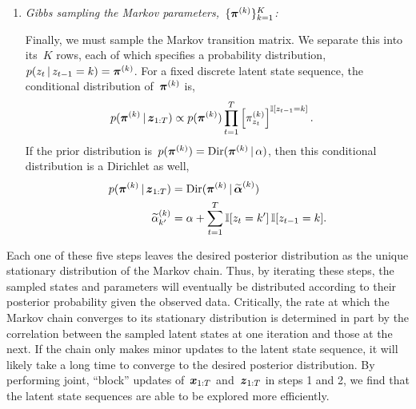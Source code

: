 \documentclass{article}
\begin{document}
\begin{enumerate}
  \item \textit{Gibbs sampling the Markov parameters,~$\{\boldsymbol{\pi}^{(k)}\}_{k=1}^K$:}
    
    Finally, we must sample the Markov transition matrix. We separate
    this into its~$K$ rows, each of which specifies a probability
    distribution,~$p(z_t \,|\, z_{t-1}=k) = \boldsymbol{\pi}^{(k)}$.  For a fixed
    discrete latent state sequence, the conditional distribution of~$\boldsymbol{\pi}^{(k)}$ 
    is,
    \begin{align}
      p(\boldsymbol{\pi}^{(k)} \,|\, \boldsymbol{z}_{1:T}) &\propto
      p(\boldsymbol{\pi}^{(k)}) \prod_{t=1}^T \left[ \pi_{z_t}^{(k)} \right]^{\mathbb{I}[z_{t-1}=k]}.
    \end{align}
    If the prior distribution is~$p(\boldsymbol{\pi}^{(k)}) = \mathrm{Dir}(\boldsymbol{\pi}^{(k)} \,|\, \alpha)$, then this
    conditional distribution is a Dirichlet as well,
    \begin{align}
      p(\boldsymbol{\pi}^{(k)} \,|\, \boldsymbol{z}_{1:T}) 
      &= \mathrm{Dir}(\boldsymbol{\pi}^{(k)} \,|\, \widetilde{\boldsymbol{\alpha}}^{(k)}) \\
      \widetilde{\alpha}_{k'}^{(k)} &= \alpha + \sum_{t=1}^T \mathbb{I}[z_t = k'] \, \mathbb{I}[z_{t-1}=k].
    \end{align}
\end{enumerate} 

Each one of these five steps leaves the desired posterior distribution as the 
unique stationary distribution of the Markov chain. Thus, by iterating these 
steps, the sampled states and parameters will eventually be distributed according
to their posterior probability given the observed data. Critically, the rate 
at which the Markov chain converges to its stationary distribution is determined
in part by the correlation between the sampled latent states at one iteration and
those at the next. If the chain only makes minor updates to the latent state sequence,
it will likely take a long time to converge to the desired posterior distribution.  
By performing joint, ``block'' updates of~$\boldsymbol{x}_{1:T}$ and~$\boldsymbol{z}_{1:T}$ in steps 
1 and 2, we find that the latent state sequences are able to be explored more 
efficiently.
\end{document}
